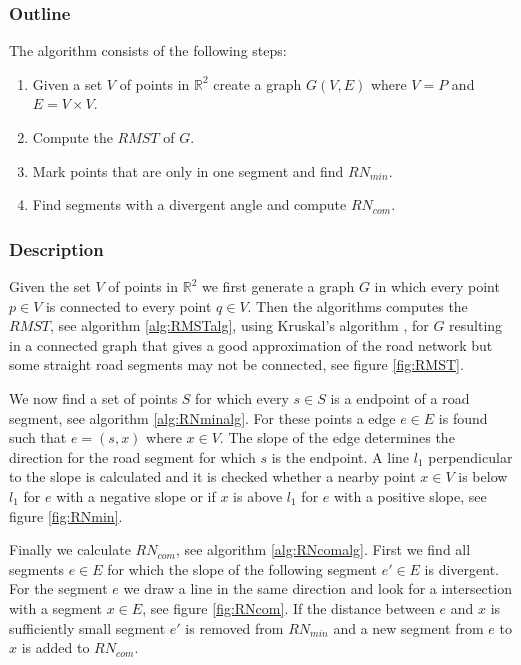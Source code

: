 \documentclass[11pt]{article}
\begin{document}
\subsubsection{Outline}

The algorithm consists of the following steps:
\begin{enumerate}
  \item Given a set $V$ of points in $\mathbb{R}^2$ create a graph $G(V,E)$ where $V=P$ and $E=V\times V$.
  \item Compute the $RMST$ of $G$.
  \item Mark points that are only in one segment and find $RN_{min}$.
  \item Find segments with a divergent angle and compute $RN_{com}$.
  \end{enumerate}
  
\subsubsection{Description}
Given the set $V$ of points in $\mathbb{R}^2$ we first generate a graph $G$ in which every point $p\in V$ is connected to every point $q \in V$. Then the algorithms computes the $RMST$, see algorithm \ref{alg:RMSTalg}, using Kruskal's algorithm \cite{kruskal}, for $G$ resulting in a connected graph that gives a good approximation of the road network but some straight road segments may not be connected, see figure \ref{fig:RMST}.

We now find a set of points $S$ for which every $s \in S$ is a endpoint of a road segment, see algorithm \ref{alg:RNminalg}. For these points a edge $e \in E$ is found such that $e=(s,x)$ where $x \in V$. The slope of the edge determines the direction for the road segment for which $s$ is the endpoint. A line $l_1$ perpendicular to the slope is calculated and it is checked whether a nearby point $x \in V$ is below $l_1$ for $e$ with a negative slope or if $x$ is above $l_1$ for $e$ with a positive slope, see figure \ref{fig:RNmin}.

Finally we calculate $RN_{com}$, see algorithm \ref{alg:RNcomalg}. First we find all segments $e \in E$ for which the slope of the following segment $e' \in E$ is divergent. For the segment $e$ we draw a line in the same direction and look for a intersection with a segment $x \in E$, see figure \ref{fig:RNcom}. If the distance between $e$ and $x$ is sufficiently small segment $e'$ is removed from $RN_{min}$ and a new segment from $e$ to $x$ is added to $RN_{com}$.
\end{document}
